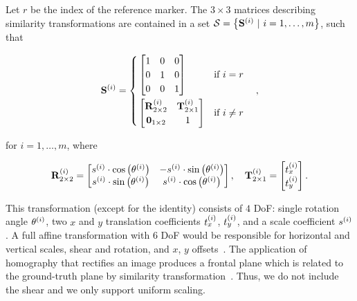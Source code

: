 Let $r$ be the index of the reference marker. The $3 \times 3$ matrices describing similarity transformations are contained in a set $\mathcal{S} = \left\{ {{\mathbf{S}}^{\left( {i} \right)} \ |\ i = 1, \dots, m} \right\}$, such that

\begin{equation}
    \label{eq:SimilarityMatrices}
    {\mathbf{S}}^{\left( {i} \right)} =
    \begin{cases}
        \begin{aligned}
            &\begin{bmatrix}
                1 & 0 & 0\\
                0 & 1 & 0\\
                0 & 0 & 1
            \end{bmatrix} & \text{if } i = r\\
            &\begin{bmatrix}
                {\mathbf{R}}_{2 \times 2}^{\left( {i} \right)} & {\mathbf{T}}_{2 \times 1}^{\left( {i} \right)}\\
                \mathbf{0}_{1 \times 2} & 1
            \end{bmatrix} & \text{if }i \neq r\\
        \end{aligned}
    \end{cases},
\end{equation}

\noindent for $i = 1, \dots, m$, where

\begin{equation}
    {\mathbf{R}}_{2 \times 2}^{\left( {i} \right)} =
    \begin{bmatrix}
        {s}^{\left( {i} \right)} \cdot {\cos} \left( {\theta}^{\left( {i} \right)} \right) & -{s}^{\left( {i} \right)} \cdot {\sin} \left( {\theta}^{\left( {i} \right)} \right)\\
        {s}^{\left( {i} \right)} \cdot {\sin} \left( {\theta}^{\left( {i} \right)} \right) & {s}^{\left( {i} \right)} \cdot {\cos} \left( {\theta}^{\left( {i} \right)} \right)
    \end{bmatrix}, \quad
    {\mathbf{T}}_{2 \times 1}^{\left( {i} \right)} =
    \begin{bmatrix}
        {t}_{x}^{\left( {i} \right)}\\
        {t}_{y}^{\left( {i} \right)}
    \end{bmatrix}.
\end{equation}

\noindent This transformation (except for the identity) consists of $4$ DoF: single rotation angle ${\theta}^{\left( {i} \right)}$, two $x$ and $y$ translation coefficients ${t}_{x}^{\left( {i} \right)}$, ${t}_{y}^{\left( {i} \right)}$, and a scale coefficient ${s}^{\left( {i} \right)}$. A full affine transformation with $6$ DoF would be responsible for horizontal and vertical
scales, shear and rotation, and $x$, $y$ offsets~\cite{barath2016novel}. The application of homography that rectifies an image produces a frontal plane which is related to the ground-truth plane by similarity transformation~\cite{hartley2003multiple, beck2016planar}. Thus, we do not include the shear and we only support uniform scaling.

